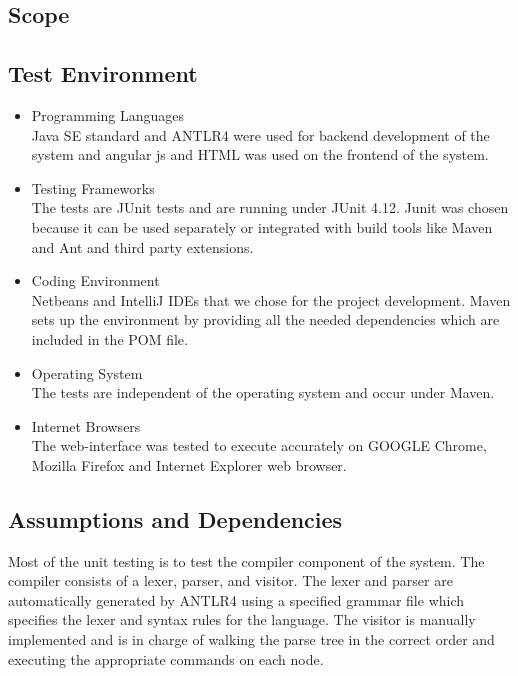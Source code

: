\documentclass[english]{article}
\begin{document}
		\subsection{Scope}
		\subsection{Test Environment}
		
		\begin{itemize}
			\item Programming Languages\\
			 Java SE standard and ANTLR4 were used for backend development of the system and angular js and HTML was used on the frontend of the system. \\
			
			\item Testing Frameworks\\
			The tests are JUnit tests and are running under JUnit 4.12. Junit was chosen because it can be used separately or integrated with build tools like Maven and Ant and third party extensions.
			
			\item Coding Environment\\
			Netbeans and IntelliJ IDEs that we chose for the project development. Maven sets up the environment by providing all the needed dependencies which are included in the POM file.\\
			
			\item Operating System\\
			The tests are independent of the operating system and occur under Maven.\\
			
			\item Internet Browsers\\
			The web-interface was tested to execute accurately on GOOGLE Chrome, Mozilla Firefox and Internet Explorer web browser.\\
		\end{itemize}
	
		\subsection{Assumptions and Dependencies}
		Most of the unit testing is to test the compiler component of the system. The compiler consists of a lexer, parser, and visitor. The lexer and parser are automatically generated by ANTLR4 using a specified grammar file which specifies the lexer and syntax rules for the language. The visitor is manually implemented and is in charge of walking the parse tree in the correct order and executing the appropriate commands on each node.
\end{document}
